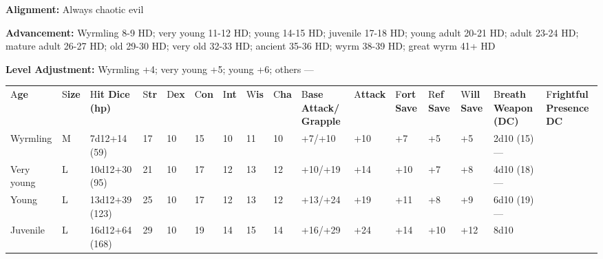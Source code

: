 \documentclass{article}
\begin{document}
\textbf{Alignment:} Always chaotic evil

\textbf{Advancement: }Wyrmling 8-9 HD; very young 11-12 HD; young 14-15 HD; juvenile 
17-18 HD; young adult 20-21 HD; adult 23-24 HD; mature adult 26-27 HD; old 29-30 
HD; very old 32-33 HD; ancient 35-36 HD; wyrm 38-39 HD; great wyrm 41+ HD

\textbf{Level Adjustment:} Wyrmling +4; very young +5; young +6; others ---

\vspace{12pt}
\begin{tabular}{|>{\raggedright}p{18pt}|>{\raggedright}p{6pt}|>{\raggedright}p{18pt}|>{\raggedright}p{4pt}|>{\raggedright}p{5pt}|>{\raggedright}p{6pt}|>{\raggedright}p{4pt}|>{\raggedright}p{5pt}|>{\raggedright}p{6pt}|>{\raggedright}p{14pt}|>{\raggedright}p{10pt}|>{\raggedright}p{8pt}|>{\raggedright}p{8pt}|>{\raggedright}p{8pt}|>{\raggedright}p{16pt}|>{\raggedright}p{17pt}|}
\hline
\multicolumn{16}{|p{158pt}|}{R\textbf{ed Dragons by Age}}\tabularnewline
\hline
A{\small{}\textbf{ge}} & S{\small{}\textbf{ize}} & H{\small{}\textbf{it Dice (hp)}} & S{\small{}\textbf{tr}} & D{\small{}\textbf{ex}} & C{\small{}\textbf{on}} & I{\small{}\textbf{nt}} & W{\small{}\textbf{is}} & C{\small{}\textbf{ha}} & B{\small{}\textbf{ase 
Attack/}}\linebreak{}
{\small{}\textbf{Grapple}} & A{\small{}\textbf{ttack}} & F{\small{}\textbf{ort 
Save}} & R{\small{}\textbf{ef Save}} & W{\small{}\textbf{ill Save}} & B{\small{}\textbf{reath 
Weapon (DC)}} & F{\small{}\textbf{rightful Presence DC}}\tabularnewline
\hline
W{\small{}yrmling} & M & 7{\small{}d12+14 (59)} & 1{\small{}7} & 1{\small{}0} & 1{\small{}5} & 1{\small{}0} & 1{\small{}1} & 1{\small{}0} & +{\small{}7/+10} & +{\small{}10} & +{\small{}7} & +{\small{}5} & +{\small{}5} & 2{\small{}d10 
(15)}--- & \tabularnewline
\hline
V{\small{}ery young} & L & 1{\small{}0d12+30 (95)} & 2{\small{}1} & 1{\small{}0} & 1{\small{}7} & 1{\small{}2} & 1{\small{}3} & 1{\small{}2} & +{\small{}10/+19} & +{\small{}14} & +{\small{}10} & +{\small{}7} & +{\small{}8} & 4{\small{}d10 
(18)}--- & \tabularnewline
\hline
Y{\small{}oung} & L & 1{\small{}3d12+39 (123)} & 2{\small{}5} & 1{\small{}0} & 1{\small{}7} & 1{\small{}2} & 1{\small{}3} & 1{\small{}2} & +{\small{}13/+24} & +{\small{}19} & +{\small{}11} & +{\small{}8} & +{\small{}9} & 6{\small{}d10 
(19)}--- & \tabularnewline
\hline
J{\small{}uvenile} & L & 1{\small{}6d12+64 (168)} & 2{\small{}9} & 1{\small{}0} & 1{\small{}9} & 1{\small{}4} & 1{\small{}5} & 1{\small{}4} & +{\small{}16/+29} & +{\small{}24} & +{\small{}14} & +{\small{}10} & +{\small{}12} & 8{\small{}d10 
}
\end{tabular}
\end{document}
